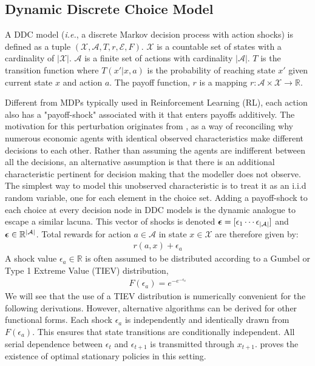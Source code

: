 \documentclass{article}
\renewcommand{\vec}[1]{\mbox{\bm{$#1$}}}
\begin{document}
\subsection{Dynamic Discrete Choice Model}

A DDC model (\emph{i.e.}, a discrete Markov decision process with action shocks) is defined as a tuple $(\mathcal{X,A}, T,r,\mathcal{E},F)$. 
$\mathcal{X}$ is a countable set of states with a cardinality of $|\mathcal{X}|$. $\mathcal{A}$ is a finite set of actions with cardinality $|\mathcal{A}|$. $T$ is the transition function where $T(x'|x,a)$ is the probability of reaching state $x'$ given current state $x$ and action $a$. The payoff function, $r$ is a mapping $r:\mathcal{A}\times\mathcal{X}\rightarrow \mathbb{R}$.

Different from MDPs typically used in Reinforcement Learning (RL), each action also has a "payoff-shock" associated with it that enters payoffs additively.
The motivation for this perturbation originates from \cite{mcfadden1973conditional}, as a way of reconciling why numerous economic agents with identical observed characteristics make different decisions to each other. Rather than assuming the agents are indifferent between all the decisions, an alternative assumption is that there is an additional characteristic pertinent for decision making that the modeller does not observe. The simplest way to model this unobserved characteristic is to treat it as an i.i.d random variable, one for each element in the choice set. Adding a payoff-shock to each choice at every decision node in DDC models is the dynamic analogue to escape a similar lacuna.
This vector of shocks is denoted $\vec{\epsilon} = [ \epsilon_{1} \cdots \epsilon_{|\mathcal{A}|} ]$ and $\vec{\epsilon}\in \mathbb{R}^{|\mathcal{A}|}$. Total rewards for action $a \in \mathcal{A}$ in state $x \in \mathcal{X}$ are therefore given by:
\begin{eqnarray}
r(a,x)+\epsilon_a
\end{eqnarray}
A shock value $\epsilon_a\in\mathbb{R}$ is often assumed to be distributed according to a Gumbel or Type 1 Extreme Value (TIEV) distribution,
\begin{align}
F(\epsilon_a)=e^{-e^{-\epsilon_a}}
\end{align}
We will see that the use of a TIEV distribution is numerically convenient for the following derivations. However, alternative algorithms can be derived for other functional forms. Each shock $\epsilon_a$ is independently and identically drawn from $F(\epsilon_a)$. This ensures that state transitions are conditionally independent. All serial dependence between $\epsilon_{t}$ and $\epsilon_{t+1}$ is transmitted through $x_{t+1}$. \cite{rust_theory} proves the existence of optimal stationary policies in this setting.
\end{document}
